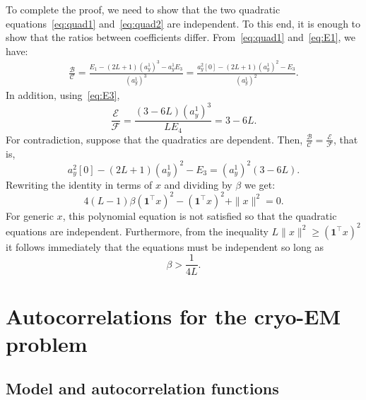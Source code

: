 \documentclass[12pt]{article}
\newcommand{\1}{\mathbf{1}}
\theoremstyle{plain}
\theoremstyle{definition}
\theoremstyle{remark}
\theoremstyle{plain}
\theoremstyle{remark}
\theoremstyle{plain}
\theoremstyle{plain}
\begin{document}
To complete the proof, we need to show that the two quadratic equations~\eqref{eq:quad1} and~\eqref{eq:quad2} are independent. To this end, it is enough to show that the ratios between coefficients differ. 
From~\eqref{eq:quad1} and~\eqref{eq:E1}, we have:
\begin{equation*}
\begin{split}
\frac{\mathcal{B}}{\mathcal{C}} = \frac{E_1 - (2L+1)(a_y^1)^3 - a_y^1E_3}{(a_y^1)^3} = \frac{a_y^2[0] - (2L+1)(a_y^1)^2 - E_3}{(a_y^1)^2}.
\end{split}
\end{equation*}
In addition, using~\eqref{eq:E3},
\begin{equation*}
\frac{\mathcal{E}}{\mathcal{F}} = \frac{(3-6L)(a_y^1)^3}{LE_4} = 3 - 6L . 
\end{equation*}
For contradiction, suppose that the quadratics are dependent. Then, $\frac{\mathcal{B}}{\mathcal{C}} =\frac{\mathcal{E}}{\mathcal{F}} $, that is, 	
\begin{equation*}
a_y^2[0] - (2L+1)(a_y^1)^2 - E_3 = (a_y^1)^2(3-6L).
\end{equation*}
Rewriting the identity in terms of $x$ and dividing by $\beta$ we get:
\begin{equation} \label{eq:cond}
4(L-1)\beta (\1^\top x)^2  - (\1^\top x)^2 + \|x\|^2 = 0.
\end{equation}	
For generic $x$,  this polynomial equation is not satisfied so that the quadratic equations are independent. 
Furthermore, from the inequality $L\|x\|^2 \ge (\1^\top x)^2$ it follows immediately that the equations must be independent so long as
\begin{equation*}
\beta > \frac{1}{4L}.
\end{equation*}

\section{Autocorrelations for the cryo-EM problem} \label{sec:ac_cryo}

\subsection{Model and autocorrelation functions}
\end{document}
